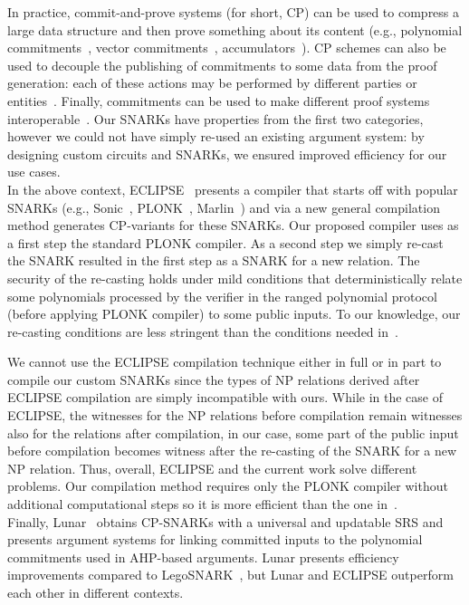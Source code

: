 In practice, commit-and-prove systems (for short, CP) can be used to compress a large data structure and then prove something about its
content (e.g., polynomial commitments~\cite{KZG_10}, vector commitments~\cite{vector_commitment_1}, accumulators~\cite{first_accumulator}).
CP schemes can also be used to decouple the publishing of commitments to some data from the proof generation: each of these actions may be
performed by different parties or entities~\cite{zkp_reference}. Finally, commitments can be used to make different proof systems
interoperable~\cite{CP_paper,interoperability_2}. Our SNARKs have properties from the first two categories, however we could not
have simply re-used an existing argument system: by designing custom circuits and SNARKs, we ensured improved efficiency for our use cases. \\

In the above context, ECLIPSE~\cite{eclipse} presents a compiler that starts off with popular SNARKs (e.g., Sonic~\cite{sonic}, PLONK~\cite{plonk},
Marlin~\cite{marlin}) and via a new general compilation method generates CP-variants for these SNARKs.
Our proposed compiler uses as a first step the standard PLONK compiler.  As a second step we simply
re-cast the SNARK resulted in the first step as a SNARK for a new relation.
The security of the re-casting holds under mild conditions that deterministically relate some polynomials
processed by the verifier in the ranged polynomial protocol (before applying PLONK compiler) to some
public inputs. To our knowledge, our re-casting conditions are less stringent than the conditions needed
in~\cite{eclipse}.

We cannot use the ECLIPSE compilation technique either in full or in part to compile our custom SNARKs
since the types of NP relations derived after ECLIPSE compilation are simply incompatible with ours. While in the
case of ECLIPSE, the witnesses for the NP relations before compilation remain witnesses also for the relations
after compilation, in our case, some part of the public input before compilation becomes witness after the
re-casting of the SNARK for a new NP relation. Thus, overall, ECLIPSE and the current work solve different problems.
Our compilation method requires only the PLONK compiler without additional computational
steps so it is more efficient than the one in~\cite{eclipse}. \\

Finally, Lunar~\cite{lunar} obtains CP-SNARKs with a universal and updatable SRS and presents argument systems for
linking committed inputs to the polynomial commitments used in AHP-based arguments. Lunar presents efficiency improvements compared
to LegoSNARK~\cite{CP_paper}, but Lunar and ECLIPSE outperform each other in different contexts. \\

